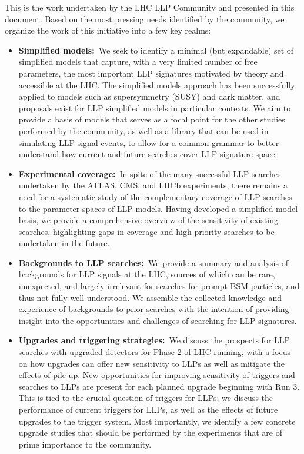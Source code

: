This is the work undertaken by the LHC LLP Community and presented in this document.
Based on the most pressing needs identified by the community, we organize the work of this initiative into a few key realms:
%
\begin{itemize}

\item {\bf Simplified models:}~We seek to identify a minimal (but expandable) set of simplified models that capture, with a very limited number of free parameters, the most important LLP signatures motivated by theory and accessible at the LHC.
The simplified models approach has been successfully applied to models such as supersymmetry (SUSY) and dark matter, and proposals exist for LLP simplified models in particular contexts.
We aim to provide a basis of models that serves as a focal point for the other studies performed by the community, as well as a library that can be used in simulating LLP signal events, to allow for a common grammar to better understand how current and future searches cover LLP signature space.

\item {\bf Experimental coverage:}~In spite of the many successful LLP searches undertaken by the ATLAS, CMS, and LHCb experiments, there remains a need for a systematic study of the complementary coverage of LLP searches to the parameter spaces of LLP models.
Having developed a simplified model basis, we provide a comprehensive overview of the sensitivity of existing searches, highlighting gaps in coverage and high-priority searches to be undertaken in the future.

\item {\bf Backgrounds to LLP searches:}~We provide a summary and analysis of backgrounds for LLP signals at the LHC, sources of which can be rare, unexpected, and largely irrelevant for searches for prompt BSM particles, and thus not fully well understood.
We assemble the collected knowledge and experience of backgrounds to prior searches with the intention of providing insight into the opportunities and challenges of searching for LLP signatures.

\item {\bf Upgrades and triggering strategies:}~We discuss the prospects for LLP searches with upgraded detectors for Phase 2 of LHC running, with a focus on how upgrades can offer new sensitivity to LLPs as well as mitigate the effects of pile-up. New opportunities for improving sensitivity of triggers and searches to LLPs are present for each planned upgrade beginning with Run 3.
This is tied to the crucial question of triggers for LLPs; we discuss the performance of current triggers for LLPs, as well as the effects of future upgrades to the trigger system.
Most importantly, we identify a few concrete upgrade studies that should be performed by the experiments that are of prime importance to the community.


\end{itemize}
